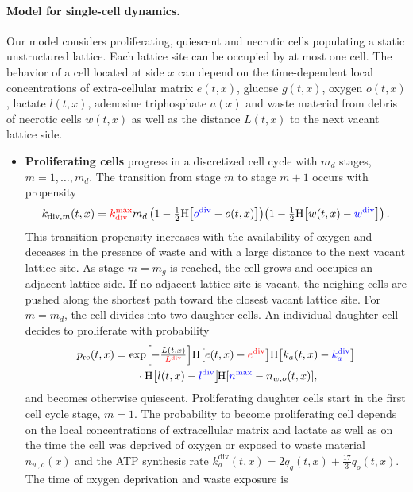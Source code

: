 \documentclass[10pt,letterpaper]{article}
\newcommand{\Heaviside}[1]{{\mathrm{H}\!\left[#1\right]}}
\newcommand{\sI}[1]{{\color{red}#1}}
\newcommand{\sII}[1]{{\color{blue}#1}}
\begin{document}
\paragraph{Model for single-cell dynamics.}
Our model considers proliferating, quiescent and necrotic cells populating a static unstructured lattice. Each lattice site can be occupied by at most one cell. The behavior of a cell located at side $x$ can depend on the time-dependent local concentrations of extra-cellular matrix $e(t,x)$, glucose $g(t,x)$, oxygen $o(t,x)$, lactate $l(t,x)$, adenosine triphosphate $a(x)$ and waste material from debris of necrotic cells $w(t,x)$ as well as the distance $L(t,x)$ to the next vacant lattice side. 
\begin{itemize}
%
\item \textbf{Proliferating cells} progress in a discretized cell cycle with $m_d$ stages, $m = 1,\ldots, m_d$. The transition from stage $m$ to stage $m+1$ occurs with propensity
\begin{equation*}
k_{\text{div},m}(t,x)  = \sI{k_{\text{div}}^{\max}} m_{d} \,  \!  \left(1 - \tfrac{1}{2} \Heaviside{\sII{o^{\text{div}}} - o(t,x)}\right) \! \left(1 - \tfrac{1}{2} \Heaviside{w(t,x)-\sII{w^{\text{div}}}}\right).
\end{equation*}
This transition propensity increases with the availability of oxygen and deceases in the presence of waste and with a large distance to the next vacant lattice site. As stage $m = m_g$ is reached, the cell grows and occupies an adjacent lattice side. If no adjacent lattice site is vacant, the neighing cells are pushed along the shortest path toward the closest vacant lattice site. For $m = m_{d}$, the cell divides into two daughter cells. An individual daughter cell decides to proliferate with probability
\begin{equation*}
\begin{aligned}
p_{\text{re}}(t,x) &= \exp\!\left[-\tfrac{L(t,x)}{\sI{L^{\text{div}}}}\right] \! \Heaviside{e(t,x)-\sI{e^{\text{div}}}} \Heaviside{k_a(t,x)-\sII{k_a^{\text{div}}}} \\
& \qquad \cdot \Heaviside{l(t,x)-\sII{l^{\text{div}}}} \! \Heaviside{\sII{n^{\max}} - n_{w,o}(t,x)},
\end{aligned}
\end{equation*}
and becomes otherwise quiescent. Proliferating daughter cells start in the first cell cycle stage, $m = 1$. The probability to become proliferating cell depends on the local concentrations of extracellular matrix and lactate as well as on the time the cell was deprived of oxygen or exposed to waste material $n_{w,o}(x)$ and the ATP synthesis rate $k_a^{\text{div}}(t,x) = 2 q_g(t,x) + \frac{17}{3} q_o(t,x)$. The time of oxygen deprivation and waste exposure is

\end{itemize}
\end{document}

